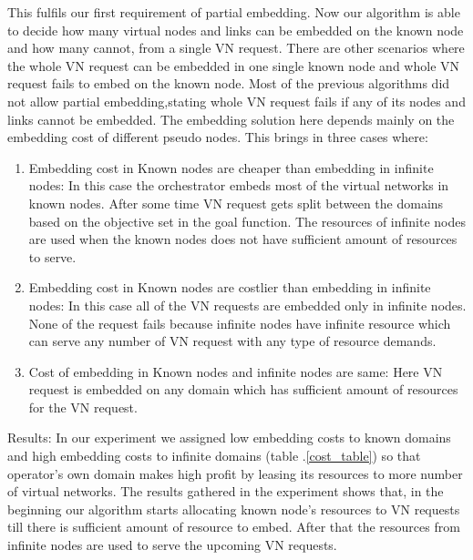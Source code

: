 \documentclass[article,dr=phil,type=msc ,colorback,accentcolor=tud4b]{tudthesis}
\begin{document}
This fulfils our first requirement of partial embedding. Now our algorithm is able to decide how many virtual nodes and links can be embedded on the known node and how many cannot, from a single VN request. There are other scenarios where the whole VN request can be embedded in one single known node and whole VN request fails to embed on the known node. Most of the previous algorithms did not allow partial embedding,stating whole VN request fails if any of its nodes and links cannot be embedded. The embedding solution here depends mainly on the embedding cost of different pseudo nodes. This brings in three cases where:
\begin{enumerate}
\item Embedding cost in Known nodes are cheaper than embedding in infinite nodes: In this case the orchestrator embeds most of the virtual networks in known nodes. After some time VN request gets split between the domains based on the objective set in the goal function. The resources of infinite nodes are used when the known nodes does not have sufficient amount of resources to serve.
	
\item  Embedding cost in Known nodes are costlier than embedding in infinite nodes: In this case all of the VN requests are embedded only in infinite nodes. None of the request fails because infinite nodes have infinite resource which can serve any number of VN request with any type of resource demands.

\item Cost of embedding in Known nodes and infinite nodes are same: Here VN request is embedded on any domain which has sufficient amount of resources for the VN request. 
\end{enumerate}

Results: 
In our experiment we assigned low embedding costs to known domains and high embedding costs to infinite domains (table .\ref{cost_table}) so that operator's own domain makes high profit by leasing its resources to more number of virtual networks. The results gathered in the experiment shows that, in the beginning our algorithm starts allocating known node's resources to VN requests till there is sufficient amount of resource to embed. After that  
the resources from infinite nodes are used to serve the upcoming VN requests.
\end{document}
